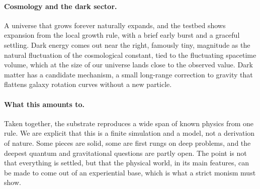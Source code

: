 \paragraph{Cosmology and the dark sector.}
A universe that grows forever naturally expands, and the testbed shows expansion from the local
growth rule, with a brief early burst and a graceful settling. Dark energy comes out near the
right, famously tiny, magnitude as the natural fluctuation of the cosmological constant, tied to
the fluctuating spacetime volume, which at the size of our universe lands close to the observed
value. Dark matter has a candidate mechanism, a small long-range correction to gravity that
flattens galaxy rotation curves without a new particle.

\paragraph{What this amounts to.}
Taken together, the substrate reproduces a wide span of known physics from one rule. We are
explicit that this is a finite simulation and a model, not a derivation of nature. Some pieces
are solid, some are first rungs on deep problems, and the deepest quantum and gravitational
questions are partly open. The point is not that everything is settled, but that the physical
world, in its main features, can be made to come out of an experiential base, which is what a
strict monism must show.

